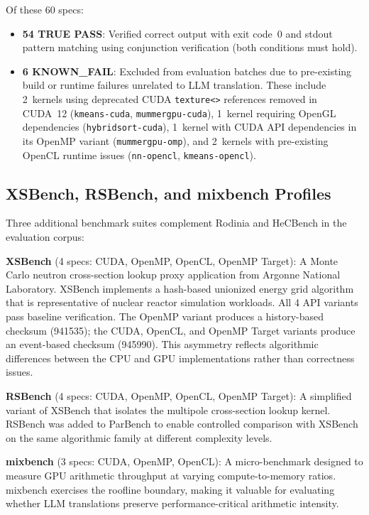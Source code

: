 Of these 60 specs:
\begin{itemize}
  \item \textbf{54 TRUE PASS}: Verified correct output with exit code~0 and
    stdout pattern matching using conjunction verification (both conditions must
    hold).
  \item \textbf{6 KNOWN\_FAIL}: Excluded from evaluation batches due to
    pre-existing build or runtime failures unrelated to LLM translation. These
    include 2~kernels using deprecated CUDA \texttt{texture<>} references
    removed in CUDA~12 (\texttt{kmeans-cuda}, \texttt{mummergpu-cuda}),
    1~kernel requiring OpenGL dependencies (\texttt{hybridsort-cuda}), 1~kernel
    with CUDA API dependencies in its OpenMP variant (\texttt{mummergpu-omp}),
    and 2~kernels with pre-existing OpenCL runtime issues (\texttt{nn-opencl},
    \texttt{kmeans-opencl}).
\end{itemize}

\subsection{XSBench, RSBench, and mixbench Profiles}
\label{sec:appendix-b5}

Three additional benchmark suites complement Rodinia and HeCBench in the
evaluation corpus:

\textbf{XSBench} (4 specs: CUDA, OpenMP, OpenCL, OpenMP Target): A Monte Carlo
neutron cross-section lookup proxy application from Argonne National Laboratory.
XSBench implements a hash-based unionized energy grid algorithm that is
representative of nuclear reactor simulation workloads. All 4 API variants pass
baseline verification. The OpenMP variant produces a history-based checksum
(941535); the CUDA, OpenCL, and OpenMP Target variants produce an event-based
checksum (945990). This asymmetry reflects algorithmic differences between the
CPU and GPU implementations rather than correctness issues.

\textbf{RSBench} (4 specs: CUDA, OpenMP, OpenCL, OpenMP Target): A simplified
variant of XSBench that isolates the multipole cross-section lookup kernel.
RSBench was added to ParBench to enable controlled comparison with XSBench on
the same algorithmic family at different complexity levels.

\textbf{mixbench} (3 specs: CUDA, OpenMP, OpenCL): A micro-benchmark designed to
measure GPU arithmetic throughput at varying compute-to-memory ratios. mixbench
exercises the roofline boundary, making it valuable for evaluating whether LLM
translations preserve performance-critical arithmetic intensity.

